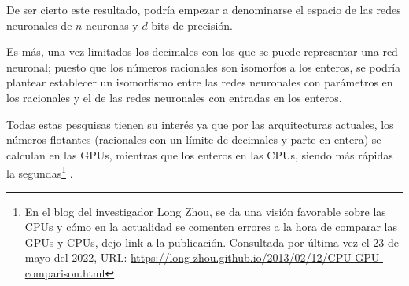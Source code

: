 De ser cierto este resultado, podría empezar a denominarse el espacio 
de las redes neuronales de $n$  neuronas y $d$ bits de precisión. 

Es más, una vez limitados los decimales con los que se puede representar una red neuronal; puesto que los números racionales son isomorfos a los enteros, se podría plantear establecer un isomorfismo entre las redes neuronales con parámetros
en los racionales y el 
de las redes neuronales con entradas en los enteros. 
 
Todas estas pesquisas tienen su interés ya que por las arquitecturas 
actuales, los números flotantes (racionales con un límite de decimales y parte en entera) se calculan en las GPUs, mientras que los enteros en las CPUs, siendo más rápidas la segundas\footnote{En el blog del investigador Long Zhou, se da una visión favorable sobre las CPUs y cómo en la actualidad se comenten errores a la hora de comparar las GPUs y CPUs, dejo link a la publicación. Consultada por última vez el 23 de mayo
del 2022, URL: \url{https://long-zhou.github.io/2013/02/12/CPU-GPU-comparison.html}} \cite{CPU-vs-GPUS}. 

